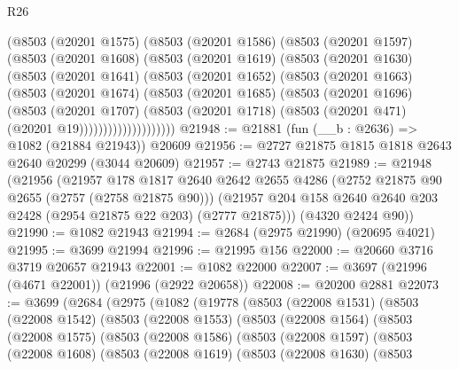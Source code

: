 \begin{lexlean}{R26}
\begin{coremodule}
            (@8503
              (@20201 @1575)
              (@8503
                (@20201 @1586)
                (@8503
                  (@20201 @1597)
                  (@8503
                    (@20201 @1608)
                    (@8503
                      (@20201 @1619)
                      (@8503
                        (@20201 @1630)
                        (@8503
                          (@20201 @1641)
                          (@8503
                            (@20201 @1652)
                            (@8503
                              (@20201 @1663)
                              (@8503
                                (@20201 @1674)
                                (@8503
                                  (@20201 @1685)
                                  (@8503
                                    (@20201 @1696)
                                    (@8503
                                      (@20201 @1707)
                                      (@8503
                                        (@20201 @1718)
                                        (@8503 (@20201 @471) (@20201 @19))))))))))))))))))))
@21948 := @21881 (fun (__b : @2636) => @1082 (@21884 @21943)) @20609
@21956 := @2727 @21875 @1815 @1818 @2643 @2640 @20299 (@3044 @20609)
@21957 := @2743 @21875
@21989 := @21948
    (@21956
      (@21957
        @178
        @1817
        @2640
        @2642
        @2655
        @4286
        (@2752 @21875 @90 @2655 (@2757 (@2758 @21875 @90)))
        (@21957 @204 @158 @2640 @2640 @203 @2428 (@2954 @21875 @22 @203) (@2777 @21875)))
      (@4320 @2424 @90))
@21990 := @1082 @21943
@21994 := @2684 (@2975 @21990) (@20695 @4021)
@21995 := @3699 @21994
@21996 := @21995 @156
@22000 := @20660 @3716 @3719 @20657 @21943
@22001 := @1082 @22000
@22007 := @3697 (@21996 (@4671 @22001)) (@21996 (@2922 @20658))
@22008 := @20200 @2881
@22073 := @3699
    (@2684
      (@2975
        (@1082
          (@19778
            (@8503
              (@22008 @1531)
              (@8503
                (@22008 @1542)
                (@8503
                  (@22008 @1553)
                  (@8503
                    (@22008 @1564)
                    (@8503
                      (@22008 @1575)
                      (@8503
                        (@22008 @1586)
                        (@8503
                          (@22008 @1597)
                          (@8503
                            (@22008 @1608)
                            (@8503
                              (@22008 @1619)
                              (@8503
                                (@22008 @1630)
                                (@8503

\end{coremodule}
\end{lexlean}
